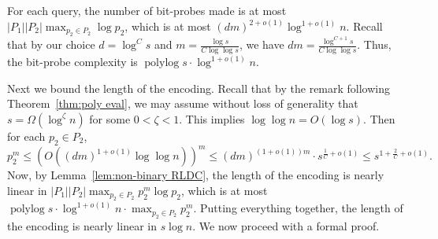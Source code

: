\documentclass[11pt,english]{article}
\theoremstyle{definition}
\theoremstyle{remark}
\newcommand{\polylog}{\operatorname{polylog} }
\begin{document}
For each query, the number of bit-probes made is at most $|P_{1}||P_{2}|\max_{p_{2}\in P_{2}}\log p_{2}$,
which is at most $(dm)^{2+o(1)}\log^{1+o(1)}n$. Recall that by our
choice $d=\log^{C}s$ and $m=\frac{\log s}{C\log\log s}$, we have $dm=\frac{\log^{C+1}s}{C\log\log s}$. Thus,
the bit-probe complexity is $\polylog s\cdot\log^{1+o(1)}n$.

Next we bound the length of the encoding.
Recall that by the remark following Theorem~\ref{thm:poly eval},
we may assume without loss of generality that $s=\Omega(\log^{\zeta}n)$
for some $0<\zeta<1$. This implies $\log\log n=O(\log s)$.
Then for each $p_{2}\in P_{2}$,
$$
p_{2}^{m} \leq \left(O\left((dm)^{1+o(1)}\log\log n\right)\right)^{m}
 \leq (dm)^{(1+o(1))m}\cdot s^{\frac{1}{C}+o(1)} \leq s^{1+\frac{2}{C}+o(1)}.
$$
Now, by Lemma~\ref{lem:non-binary RLDC}, the length of the encoding
is nearly linear in $|P_{1}||P_{2}|\max_{p_{2}\in P_{2}}p_{2}^{m}\log p_{2}$,
which is at most $\polylog s\cdot\log^{1+o(1)}n\cdot\max_{p_{2}\in P_{2}}p_{2}^{m}$.
Putting everything together, the length of the encoding is nearly
linear in $s\log n$. We now proceed with a formal proof.
\end{document}
